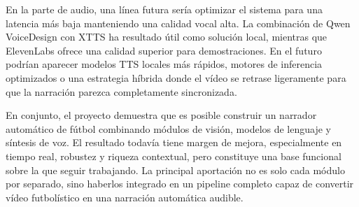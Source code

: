 En la parte de audio, una línea futura sería optimizar el sistema para una latencia más baja manteniendo una calidad vocal alta. La combinación de Qwen VoiceDesign con XTTS ha resultado útil como solución local, mientras que ElevenLabs ofrece una calidad superior para demostraciones. En el futuro podrían aparecer modelos TTS locales más rápidos, motores de inferencia optimizados o una estrategia híbrida donde el vídeo se retrase ligeramente para que la narración parezca completamente sincronizada.

En conjunto, el proyecto demuestra que es posible construir un narrador automático de fútbol combinando módulos de visión, modelos de lenguaje y síntesis de voz. El resultado todavía tiene margen de mejora, especialmente en tiempo real, robustez y riqueza contextual, pero constituye una base funcional sobre la que seguir trabajando. La principal aportación no es solo cada módulo por separado, sino haberlos integrado en un pipeline completo capaz de convertir vídeo futbolístico en una narración automática audible.


